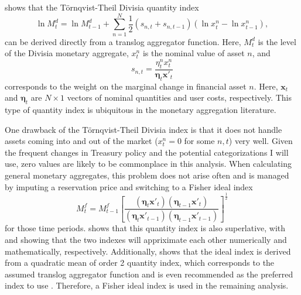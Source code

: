 \documentclass[11pt,a4paper,margin=1.5in]{article}
\begin{document}
\citet[][Section 2]{Diewert:1976} shows that the T\"{o}rnqvist-Theil Divisia quantity index 
\begin{equation*}
	\ln{M^d_t} = \ln{M^d_{t-1}} + \sum_{n=1}^{N}\frac{1}{2}(s_{n,t}+s_{n,t-1})\left(\ln{x^n_{t}} - \ln{x^n_{t-1}}\right),
	\label{DI}
\end{equation*}
can be derived directly from a translog aggregator function.
Here, $M^d_t$ is the level of the Divisia monetary aggregate, $x^n_{t}$ is the nominal value of asset $n$, and 
\begin{equation*}
	s_{n,t}  = \frac{\eta^n_{t}x^n_{t}}{\boldsymbol \eta_t \mathbf{x'}_t}
\end{equation*}
corresponds to the weight on the marginal change in financial asset $n$.
Here, $\mathbf{x}_t$ and $\boldsymbol \eta_t$ are $N \times 1$ vectors of nominal quantities and user costs, respectively.
This type of quantity index is ubiquitous in the monetary aggregation literature.

One drawback of the T\"{o}rnqvist-Theil Divisia index is that it does not handle assets coming into and out of the market ($x^n_{t} = 0$ for some $n,t$) very well.
Given the frequent changes in Treasury policy and the potential categorizations I will use, zero values are likely to be commonplace in this analysis.
When calculating general monetary aggregates, this problem does not arise often and is managed by imputing a reservation price and switching to a Fisher ideal index 
\begin{equation}
	M^f_t = M^f_{t-1}\left[\frac{(\boldsymbol \eta_t \mathbf{x'}_t) (\boldsymbol \eta_{t-1} \mathbf{x'}_t)}{(\boldsymbol \eta_t \mathbf{x'}_{t-1}) (\boldsymbol \eta_{t-1} \mathbf{x'}_{t-1})}\right]^{\frac{1}{2}}
	\label{eq:FisherIdeal}
\end{equation}
for those time periods.
\citet{Diewert:1976} shows that this quantity index is also superlative, with \citet{Diewert:1978} and \citet{Dumagan:2002} showing that the two indexes will appriximate each other numerically and mathematically, respectively.
Additionally, \citet{Diewert:1976} shows that the ideal index is derived from a quadratic mean of order 2 quantity index, which corresponds to the assumed translog aggregator function and is even recommended as the preferred index to use \citep[][Section 5]{Diewert:1976}.
Therefore, a Fisher ideal index is used in the remaining analysis.
\end{document}
